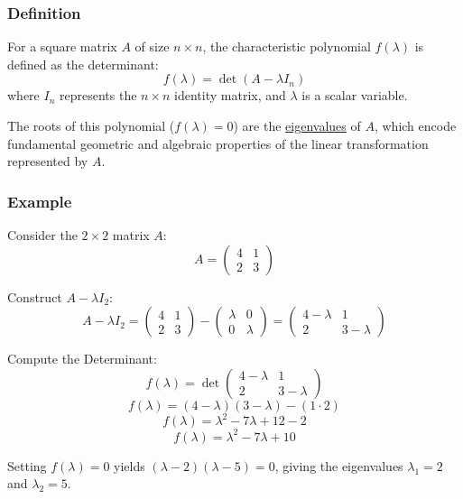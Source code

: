 \subsubsection*{Definition}
For a square matrix $A$ of size $n \times n$, the characteristic polynomial $f(\lambda)$ is defined as the determinant:
\[f(\lambda) = \det(A - \lambda I_n)\]
where $I_n$ represents the $n \times n$ identity matrix, and $\lambda$ is a scalar variable.

The roots of this polynomial ($f(\lambda) = 0$) are the \href{https://en.wikipedia.org/wiki/Eigenvalues_and_eigenvectors}{eigenvalues} of $A$, which encode fundamental geometric and algebraic properties of the linear transformation represented by $A$.

\subsubsection*{Example}
Consider the $2 \times 2$ matrix $A$:
\[ A = \begin{pmatrix} 4 & 1 \\ 2 & 3 \end{pmatrix} \]

Construct $A - \lambda I_2$:
\[ A - \lambda I_2 = \begin{pmatrix} 4 & 1 \\ 2 & 3 \end{pmatrix} - \begin{pmatrix} \lambda & 0 \\ 0 & \lambda \end{pmatrix} = \begin{pmatrix} 4 - \lambda & 1 \\ 2 & 3 - \lambda \end{pmatrix} \]

Compute the Determinant:
\[ f(\lambda) = \det\begin{pmatrix} 4 - \lambda & 1 \\ 2 & 3 - \lambda \end{pmatrix} \]
\[ f(\lambda) = (4 - \lambda)(3 - \lambda) - (1 \cdot 2) \]
\[ f(\lambda) = \lambda^2 - 7\lambda + 12 - 2 \]
\[ f(\lambda) = \lambda^2 - 7\lambda + 10 \]

Setting $f(\lambda) = 0$ yields $(\lambda - 2)(\lambda - 5) = 0$, giving the eigenvalues $\lambda_1 = 2$ and $\lambda_2 = 5$.

